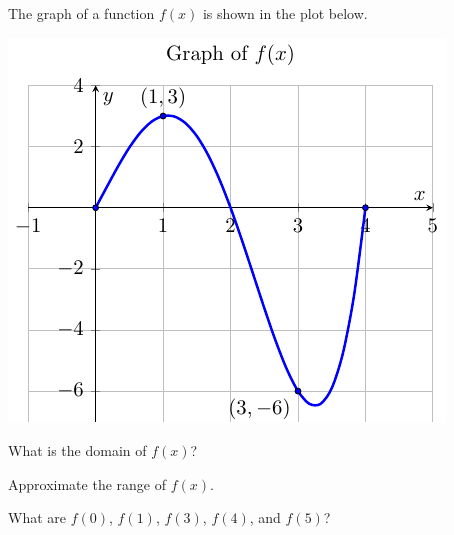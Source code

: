 \begin{activity}\label{A:0.1.1}
The graph of a function $f(x)$ is shown in the plot below. 

\begin{minipage}{0.5\columnwidth}
\begin{center}
    \includegraphics[width=0.9\columnwidth]{figures/0-1-act1.pdf}
\end{center}
\end{minipage}
\begin{minipage}{0.5\columnwidth}
\ba
\item What is the domain of $f(x)$?
\item Approximate the range of $f(x)$.
\item What are  $f(0)$, $f(1)$, $f(3)$, $f(4)$, and $f(5)$?
\ea
\end{minipage}

\end{activity}

